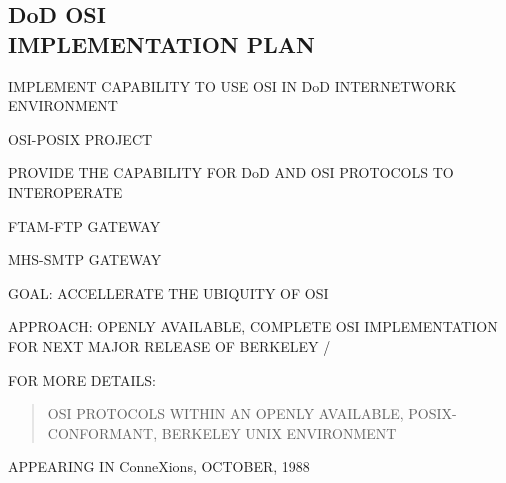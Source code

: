 \begin{bwslide}
\part*	{DoD OSI\\ IMPLEMENTATION PLAN}\bf

\begin{nrtc}
\item	IMPLEMENT CAPABILITY TO USE OSI IN DoD INTERNETWORK ENVIRONMENT
    \begin{nrtc}
    \item	OSI-POSIX PROJECT
    \end{nrtc}

\item	PROVIDE THE CAPABILITY FOR DoD AND OSI PROTOCOLS TO INTEROPERATE
    \begin{nrtc}
    \item	FTAM-FTP GATEWAY

    \item	MHS-SMTP GATEWAY
    \end{nrtc}
\end{nrtc}
\end{bwslide}


\begin{bwslide}

\begin{nrtc}
\item	GOAL: ACCELLERATE THE UBIQUITY OF OSI

\item	APPROACH: OPENLY AVAILABLE, COMPLETE OSI IMPLEMENTATION FOR NEXT MAJOR
	RELEASE OF BERKELEY \unix/

\item	FOR MORE DETAILS:
\begin{quote}
OSI PROTOCOLS WITHIN AN OPENLY AVAILABLE, POSIX-CONFORMANT, BERKELEY UNIX
ENVIRONMENT
\end{quote}
APPEARING IN ConneXions, OCTOBER, 1988
\end{nrtc}
\end{bwslide}


\begin{bwslide}
\end{bwslide}


\begin{bwslide}
\end{bwslide}


